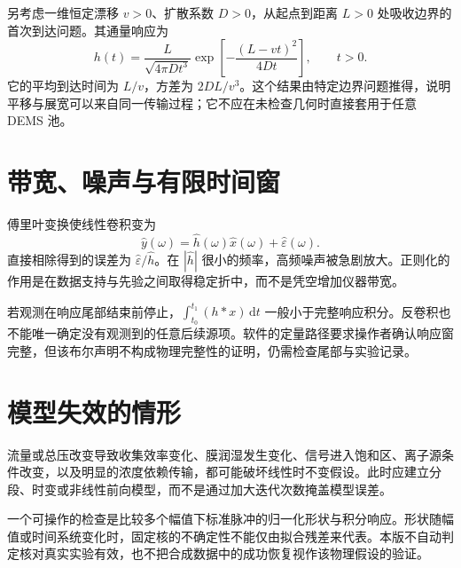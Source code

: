 另考虑一维恒定漂移 $v>0$、扩散系数 $D>0$，从起点到距离 $L>0$ 处吸收边界的首次到达问题。其通量响应为
\begin{equation}
 h(t)=\frac{L}{\sqrt{4\pi Dt^3}}
 \exp\!\left[-\frac{(L-vt)^2}{4Dt}\right],\qquad t>0.
\end{equation}
它的平均到达时间为 $L/v$，方差为 $2DL/v^3$。这个结果由特定边界问题推得，说明平移与展宽可以来自同一传输过程；它不应在未检查几何时直接套用于任意 DEMS 池。

\section{带宽、噪声与有限时间窗}
傅里叶变换使线性卷积变为
\begin{equation}
\widehat y(\omega)=\widehat h(\omega)\widehat x(\omega)+\widehat\varepsilon(\omega).
\end{equation}
直接相除得到的误差为 $\widehat\varepsilon/\widehat h$。在 $|\widehat h|$ 很小的频率，高频噪声被急剧放大。正则化的作用是在数据支持与先验之间取得稳定折中，而不是凭空增加仪器带宽。

若观测在响应尾部结束前停止，$\int_{t_0}^{t_1}(h*x)\,\mathrm dt$ 一般小于完整响应积分。反卷积也不能唯一确定没有观测到的任意后续源项。软件的定量路径要求操作者确认响应窗完整，但该布尔声明不构成物理完整性的证明，仍需检查尾部与实验记录。

\section{模型失效的情形}
流量或总压改变导致收集效率变化、膜润湿发生变化、信号进入饱和区、离子源条件改变，以及明显的浓度依赖传输，都可能破坏线性时不变假设。此时应建立分段、时变或非线性前向模型，而不是通过加大迭代次数掩盖模型误差。

一个可操作的检查是比较多个幅值下标准脉冲的归一化形状与积分响应。形状随幅值或时间系统变化时，固定核的不确定性不能仅由拟合残差来代表。本版不自动判定核对真实实验有效，也不把合成数据中的成功恢复视作该物理假设的验证。
